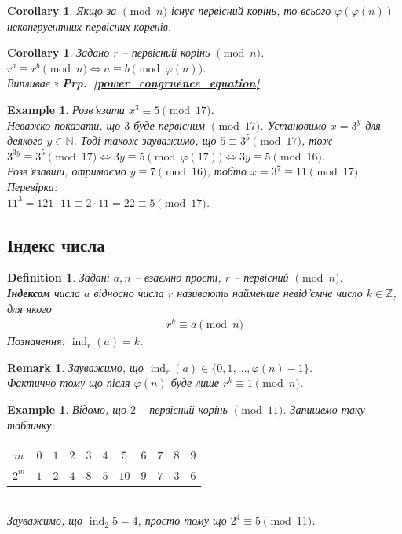 \documentclass[a4paper, 10pt]{article}
\theoremstyle{theoremdd}
\theoremstyle{theoremdd}
\newtheorem{definition}[theorem]{Definition}
\theoremstyle{theoremdd}
\theoremstyle{theoremdd}
\newtheorem{example}[theorem]{Example}
\theoremstyle{theoremdd}
\theoremstyle{theoremdd}
\newtheorem{remark}[theorem]{Remark}
\theoremstyle{theoremdd}
\theoremstyle{theoremdd}
\newtheorem{corollary}[theorem]{Corollary}
\DeclareMathOperator{\ind}{ind}
\newcommand\prpref[1]{\textbf{Prp.~\ref{#1}}}
\begin{document}
\begin{corollary}
Якщо за $\!\! \pmod n$ існує первісний корінь, то всього $\varphi(\varphi(n))$ неконгруентних первісних коренів.
\end{corollary}

\begin{corollary}
Задано $r$ -- первісний корінь $\!\! \pmod n$.\\
$r^a \equiv r^b \pmod n \iff a \equiv b \pmod {\varphi(n)}$.\\
\textit{Випливає з} \prpref{power_congruence_equation}
\end{corollary}

\begin{example}
Розв'язати $x^3 \equiv 5 \pmod {17}$.\\
Неважко показати, що $3$ буде первісним $\!\! \pmod {17}$. Установимо $x = 3^y$ для деякого $y \in \mathbb{N}$. Тоді також зауважимо, що $5 \equiv 3^5 \pmod {17}$, тож\\
$3^{3y} \equiv 3^5 \pmod {17} \iff 3y \equiv 5 \pmod {\varphi(17)} \iff 3y \equiv 5 \pmod {16}$.\\
Розв'язавши, отримаємо $y \equiv 7 \pmod {16}$, тобто $x = 3^7 \equiv 11 \pmod {17}$.\\
Перевірка:\\
$11^3 = 121 \cdot 11 \equiv 2 \cdot 11 = 22 \equiv 5 \pmod {17}$.
\end{example}

\subsection{Індекс числа}
\begin{definition}
Задані $a,n$ -- взаємно прості, $r$ -- первісний $\!\! \pmod n$.\\
\textbf{Індексом} числа $a$ відносно числа $r$ називають найменше невід'ємне число $k \in \mathbb{Z}$, для якого
\begin{align*}
r^k \equiv a \pmod n
\end{align*}
Позначення: $\ind_r (a) = k$.
\end{definition}

\begin{remark}
Зауважимо, що $\ind_r (a) \in \{0,1,\dots,\varphi(n)-1\}$.\\
Фактично тому що після $\varphi(n)$ буде лише $r^k \equiv 1 \pmod n$.
\end{remark}

\begin{example}
Відомо, що $2$ -- первісний корінь $\!\! \pmod {11}$. Запишемо таку табличку:\\
\begin{tabular}{c|c|c|c|c|c|c|c|c|c|c}
$m$ & $0$ & $1$ & $2$ & $3$ & $4$ & $5$ & $6$ & $7$ & $8$ & $9$ \\
\hline
$2^m$ & $1$ & $2$ & $4$ & $8$ & $5$ & $10$ & $9$ & $7$ & $3$ & $6$
\end{tabular}\\
Зауважимо, що $\ind_2 5 = 4$, просто тому що $2^4 \equiv 5 \pmod {11}$.
\end{example}
\end{document}
